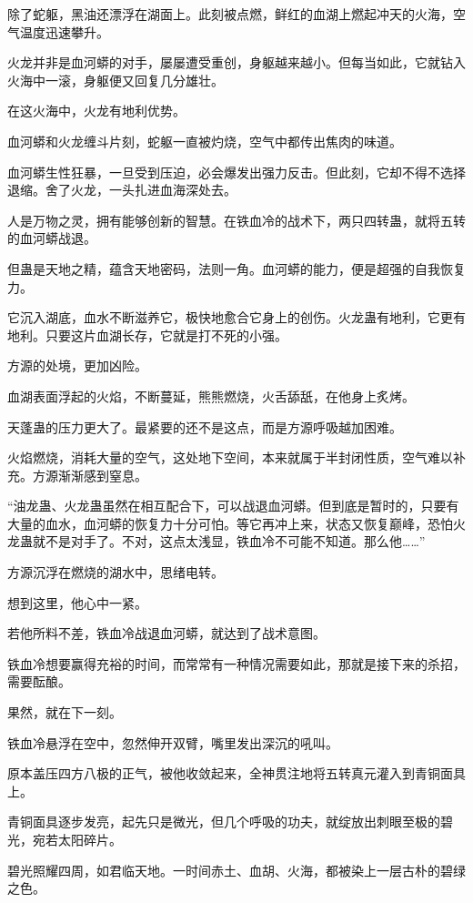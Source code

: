 \begin{this_body}
除了蛇躯，黑油还漂浮在湖面上。此刻被点燃，鲜红的血湖上燃起冲天的火海，空气温度迅速攀升。

火龙并非是血河蟒的对手，屡屡遭受重创，身躯越来越小。但每当如此，它就钻入火海中一滚，身躯便又回复几分雄壮。

在这火海中，火龙有地利优势。

血河蟒和火龙缠斗片刻，蛇躯一直被灼烧，空气中都传出焦肉的味道。

血河蟒生性狂暴，一旦受到压迫，必会爆发出强力反击。但此刻，它却不得不选择退缩。舍了火龙，一头扎进血海深处去。

人是万物之灵，拥有能够创新的智慧。在铁血冷的战术下，两只四转蛊，就将五转的血河蟒战退。

但蛊是天地之精，蕴含天地密码，法则一角。血河蟒的能力，便是超强的自我恢复力。

它沉入湖底，血水不断滋养它，极快地愈合它身上的创伤。火龙蛊有地利，它更有地利。只要这片血湖长存，它就是打不死的小强。

方源的处境，更加凶险。

血湖表面浮起的火焰，不断蔓延，熊熊燃烧，火舌舔舐，在他身上炙烤。

天蓬蛊的压力更大了。最紧要的还不是这点，而是方源呼吸越加困难。

火焰燃烧，消耗大量的空气，这处地下空间，本来就属于半封闭性质，空气难以补充。方源渐渐感到窒息。

“油龙蛊、火龙蛊虽然在相互配合下，可以战退血河蟒。但到底是暂时的，只要有大量的血水，血河蟒的恢复力十分可怕。等它再冲上来，状态又恢复巅峰，恐怕火龙蛊就不是对手了。不对，这点太浅显，铁血冷不可能不知道。那么他……”

方源沉浮在燃烧的湖水中，思绪电转。

想到这里，他心中一紧。

若他所料不差，铁血冷战退血河蟒，就达到了战术意图。

铁血冷想要赢得充裕的时间，而常常有一种情况需要如此，那就是接下来的杀招，需要酝酿。

果然，就在下一刻。

铁血冷悬浮在空中，忽然伸开双臂，嘴里发出深沉的吼叫。

原本盖压四方八极的正气，被他收敛起来，全神贯注地将五转真元灌入到青铜面具上。

青铜面具逐步发亮，起先只是微光，但几个呼吸的功夫，就绽放出刺眼至极的碧光，宛若太阳碎片。

碧光照耀四周，如君临天地。一时间赤土、血胡、火海，都被染上一层古朴的碧绿之色。


\end{this_body}
